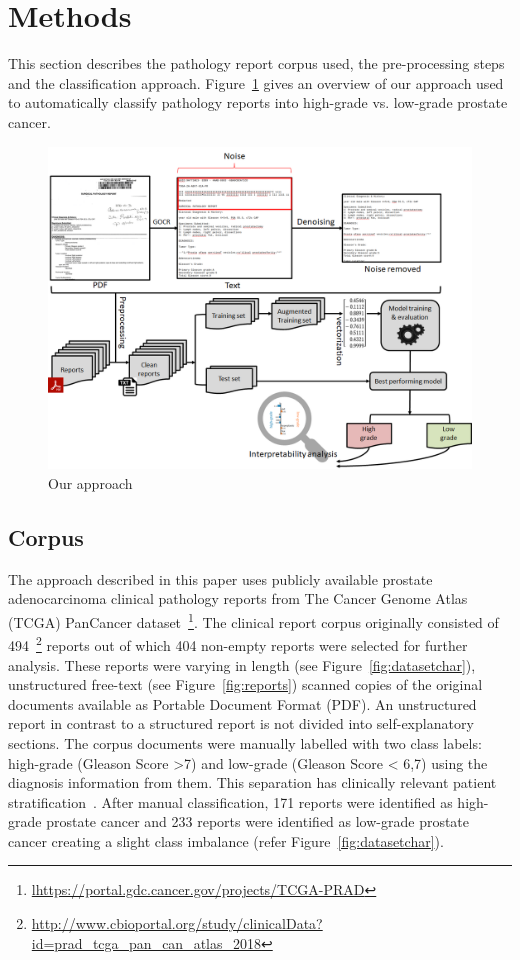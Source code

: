 \documentclass[runningheads]{llncs}
\begin{document}
\section{Methods}
\label{sec:methods}
%
This section describes the pathology report corpus used, the pre-processing steps and the classification approach.
Figure~\ref{fig:approach} gives an overview of our approach used to automatically classify pathology reports into high-grade vs. low-grade prostate cancer.
%
\begin{figure}[h!]
    \centering
    \includegraphics[scale=0.40]{figures/preprocessing.png}
    \caption{Our approach} %
    \label{fig:approach}
\end{figure}
%
\subsection{Corpus}
\label{subsec:dataset}
%
The approach described in this paper uses publicly available prostate adenocarcinoma clinical pathology reports from The Cancer Genome Atlas (TCGA) PanCancer dataset~\footnote{\url{lhttps://portal.gdc.cancer.gov/projects/TCGA-PRAD}}.
The clinical report corpus originally consisted of 494~\footnote{\url{http://www.cbioportal.org/study/clinicalData?id=prad_tcga_pan_can_atlas_2018}} reports out of which 404 non-empty reports were selected for further analysis.
These reports were varying in length (see Figure~\ref{fig:datasetchar}), unstructured free-text (see Figure~\ref{fig:reports}) scanned copies of the original documents available as Portable Document Format (PDF).
An unstructured report in contrast to a structured report is not divided into self-explanatory sections.
The corpus documents were manually labelled with two class labels: high-grade (Gleason Score >7) and low-grade (Gleason Score < 6,7) using the diagnosis information from them. This separation has clinically relevant patient stratification~\cite{NBG2001}.
After manual classification, 171 reports were identified as high-grade prostate cancer and 233 reports were identified as low-grade prostate cancer creating a slight class imbalance (refer Figure~\ref{fig:datasetchar}).
%
\end{document}
